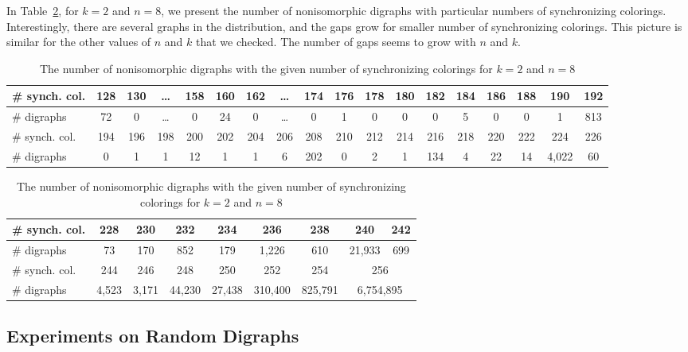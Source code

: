 \documentclass[runningheads]{llncs}
\begin{document}
In Table~\ref{tab:gaps}, for $k=2$ and $n=8$, we present the number of nonisomorphic digraphs with particular numbers of synchronizing colorings.
Interestingly, there are several graphs in the distribution, and the gaps grow for smaller number of synchronizing colorings.
This picture is similar for the other values of $n$ and $k$ that we checked. The number of gaps seems to grow with $n$ and $k$.

\begin{table}
\caption{The number of nonisomorphic digraphs with the given number of synchronizing colorings for $k=2$ and $n=8$}
\label{tab:gaps}
\begin{center}
\begin{tabular}{|l||c|c|c|c|c|c|c|c|c|c|c|c|c|c|c|c|c|} \hline
\# synch. col. & 128 & 130 & \ldots & 158 & 160 & 162 & \ldots & 174 & 176 & 178 & 180 & 182 & 184 & 186 & 188 & 190  & 192 \\ \hline
\# digraphs    & 72  & 0   & \ldots & 0   & 24  & 0   & \ldots & 0   & 1   & 0   & 0   & 0   & 5   & 0   & 0   & 1    & 813 \\ \hline\hline
\# synch. col. & 194 & 196 & 198    & 200 & 202 & 204 & 206    & 208 & 210 & 212 & 214 & 216 & 218 & 220 & 222 & 224  & 226 \\ \hline
\# digraphs    & 0   & 1   & 1      & 12  & 1   & 1   & 6      & 202 & 0   & 2   & 1   & 134 & 4   & 22  & 14  & 4,022& 60  \\ \hline
\end{tabular}
\end{center}
\begin{center}
\begin{tabular}{|l||c|c|c|c|c|c|c|c|} \hline
\# synch. col. & 228   & 230  & 232   & 234    & 236    & 238    & 240      & 242 \\ \hline
\# digraphs    & 73    & 170  & 852   & 179    & 1,226  & 610    & 21,933   & 699 \\ \hline \hline
\# synch. col. & 244   & 246  & 248   & 250    & 252    & 254    & \multicolumn{2}{c|}{256} \\ \hline
\# digraphs    & 4,523 & 3,171& 44,230& 27,438 & 310,400& 825,791& \multicolumn{2}{c|}{6,754,895} \\ \hline
\end{tabular}
\end{center}
\end{table}

\subsection{Experiments on Random Digraphs}
\end{document}
